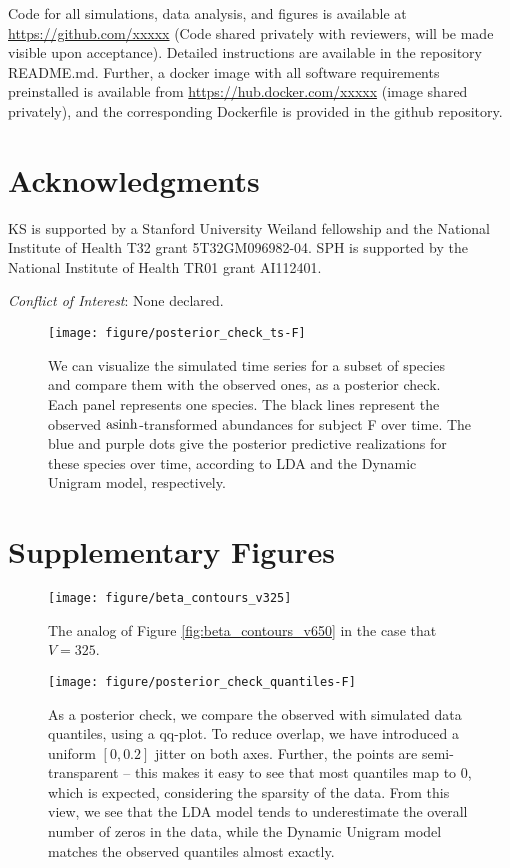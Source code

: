 \documentclass[oupdraft]{bio}
\begin{document}
Code for all simulations, data analysis, and figures is available at
\url{https://github.com/xxxxx} (Code shared privately with reviewers, will be
made visible upon acceptance). Detailed instructions are available in the
repository README.md. Further, a docker image with all software requirements
preinstalled is available from \url{https://hub.docker.com/xxxxx} (image shared
privately), and the corresponding Dockerfile is provided in the github
repository.

\section*{Acknowledgments}

KS is supported by a Stanford University Weiland fellowship and the National
Institute of Health T32 grant 5T32GM096982-04. SPH is supported by the National
Institute of Health TR01 grant AI112401.

{\it Conflict of Interest}: None declared.




\begin{figure}[!p]
  \centering
  \texttt{[image: figure/posterior\_check\_ts-F]}
  \caption{We can visualize the simulated time series for a subset of species
    and compare them with the observed ones, as a posterior check. Each panel
    represents one species. The black lines represent the observed
    $\mathop\mathrm{asinh}$-transformed abundances for subject F over time. The blue and purple
    dots give the posterior predictive realizations for these species over time,
    according to LDA and the Dynamic Unigram model, respectively.
    \label{fig:antibiotics_posterior_ts}}
\end{figure}
\section{Supplementary Figures}

\begin{figure}[!p]
  \centering
  \texttt{[image: figure/beta\_contours\_v325]}
  \caption{The analog of Figure \ref{fig:beta_contours_v650} in the case that $V
    = 325$. \label{fig:beta_contours_v325}}
\end{figure}

\begin{figure}[!p]
  \centering
  \texttt{[image: figure/posterior\_check\_quantiles-F]}
  \caption{As a posterior check, we compare the observed with simulated
    data quantiles, using a qq-plot. To reduce overlap, we have introduced a
    uniform $\left[0, 0.2\right]$ jitter on both axes. Further, the points are
    semi-transparent -- this makes it easy to see that most quantiles map to 0,
    which is expected, considering the sparsity of the data. From this view, we
    see that the LDA model tends to underestimate the overall number of zeros in
    the data, while the Dynamic Unigram model matches the observed quantiles
    almost exactly. \label{fig:antibiotics_posterior_quantiles} }
\end{figure}
\end{document}
